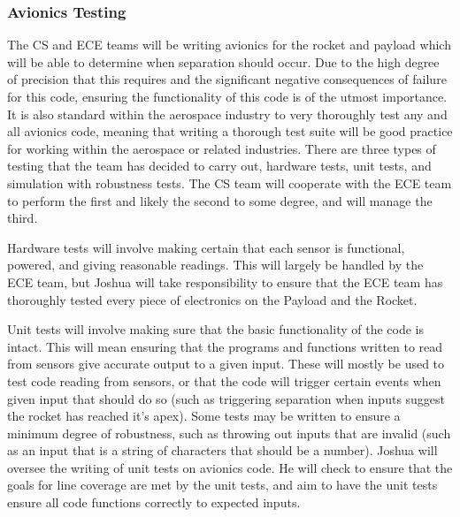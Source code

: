 \documentclass[onecolumn, draftclsnofoot, 10pt, compsoc]{IEEEtran}
\begin{document}
\subsubsection{Avionics Testing}
The CS and ECE teams will be writing avionics for the rocket and payload which will be able to determine when separation should occur. Due to the high degree of precision that this requires and the significant negative consequences of failure for this code, ensuring the functionality of this code is of the utmost importance. It is also standard within the aerospace industry to very thoroughly test any and all avionics code, meaning that writing a thorough test suite will be good practice for working within the aerospace or related industries. There are three types of testing that the team has decided to carry out, hardware tests, unit tests, and simulation with robustness tests. The CS team will cooperate with the ECE team to perform the first and likely the second to some degree, and will manage the third.

Hardware tests will involve making certain that each sensor is functional, powered, and giving reasonable readings. This will largely be handled by the ECE team, but Joshua will take responsibility to ensure that the ECE team has thoroughly tested every piece of electronics on the Payload and the Rocket. 

Unit tests will involve making sure that the basic functionality of the code is intact. This will mean ensuring that the programs and functions written to read from sensors give accurate output to a given input. These will mostly be used to test code reading from sensors, or that the code will trigger certain events when given input that should do so (such as triggering separation when inputs suggest the rocket has reached it’s apex). Some tests may be written to ensure a minimum degree of robustness, such as throwing out inputs that are invalid (such as an input that is a string of characters that should be a number). Joshua will oversee the writing of unit tests on avionics code. He will check to ensure that the goals for line coverage are met by the unit tests, and aim to have the unit tests ensure all code functions correctly to expected inputs.
\end{document}
